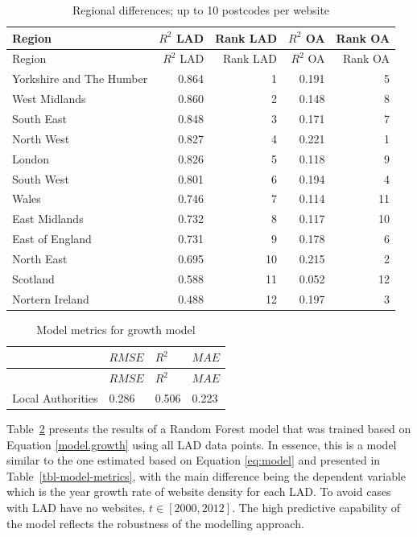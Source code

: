 \documentclass[
  authoryear,
  preprint,
  3p]{elsarticle}
\begin{document}
\begin{longtable}[]{@{}lrrrr@{}}
\caption{Regional differences; up to 10 postcodes per
website\label{table.regions.10}}\tabularnewline
\toprule\noalign{}
Region & \(R^2\) LAD & Rank LAD & \(R^2\) OA & Rank OA \\
\midrule\noalign{}
\endfirsthead
\toprule\noalign{}
Region & \(R^2\) LAD & Rank LAD & \(R^2\) OA & Rank OA \\
\midrule\noalign{}
\endhead
\bottomrule\noalign{}
\endlastfoot
Yorkshire and The Humber & 0.864 & 1 & 0.191 & 5 \\
West Midlands & 0.860 & 2 & 0.148 & 8 \\
South East & 0.848 & 3 & 0.171 & 7 \\
North West & 0.827 & 4 & 0.221 & 1 \\
London & 0.826 & 5 & 0.118 & 9 \\
South West & 0.801 & 6 & 0.194 & 4 \\
Wales & 0.746 & 7 & 0.114 & 11 \\
East Midlands & 0.732 & 8 & 0.117 & 10 \\
East of England & 0.731 & 9 & 0.178 & 6 \\
North East & 0.695 & 10 & 0.215 & 2 \\
Scotland & 0.588 & 11 & 0.052 & 12 \\
Nortern Ireland & 0.488 & 12 & 0.197 & 3 \\
\end{longtable}

\begin{longtable}[]{@{}llll@{}}
\caption{Model metrics for growth
model}\label{tbl-model-growth-metrics}\tabularnewline
\toprule\noalign{}
& \(RMSE\) & \(R^{2}\) & \(MAE\) \\
\midrule\noalign{}
\endfirsthead
\toprule\noalign{}
& \(RMSE\) & \(R^{2}\) & \(MAE\) \\
\midrule\noalign{}
\endhead
\bottomrule\noalign{}
\endlastfoot
Local Authorities & 0.286 & 0.506 & 0.223 \\
\end{longtable}

Table~\ref{tbl-model-growth-metrics} presents the results of a Random
Forest model that was trained based on Equation \ref{model.growth} using
all LAD data points. In essence, this is a model similar to the one
estimated based on Equation \ref{eq:model} and presented in
Table~\ref{tbl-model-metrics}, with the main difference being the
dependent variable which is the year growth rate of website density for
each LAD. To avoid cases with LAD have no websites,
\(t \in [2000, 2012]\). The high predictive capability of the model
reflects the robustness of the modelling approach.
\end{document}
